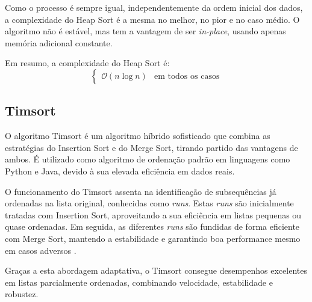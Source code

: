 \documentclass[conference]{IEEEtran}
\begin{document}
Como o processo é sempre igual, independentemente da ordem inicial dos dados, a complexidade do Heap Sort é a mesma no melhor, no pior e no caso médio. O algoritmo não é estável, mas tem a vantagem de ser \textit{in-place}, usando apenas memória adicional constante.

Em resumo, a complexidade do Heap Sort é:
\[
\begin{cases}
\mathcal{O}(n \log n) & \text{em todos os casos}
\end{cases}
\]

\subsection{Timsort}

O algoritmo Timsort é um algoritmo híbrido sofisticado que combina as estratégias do Insertion Sort e do Merge Sort, tirando partido das vantagens de ambos. É utilizado como algoritmo de ordenação padrão em linguagens como Python e Java, devido à sua elevada eficiência em dados reais.

O funcionamento do Timsort assenta na identificação de subsequências já ordenadas na lista original, conhecidas como \textit{runs}. Estas \textit{runs} são inicialmente tratadas com Insertion Sort, aproveitando a sua eficiência em listas pequenas ou quase ordenadas. Em seguida, as diferentes \textit{runs} são fundidas de forma eficiente com Merge Sort, mantendo a estabilidade e garantindo boa performance mesmo em casos adversos \cite{auger2019worstcasecomplexitytimsort}.

Graças a esta abordagem adaptativa, o Timsort consegue desempenhos excelentes em listas parcialmente ordenadas, combinando velocidade, estabilidade e robustez.
\end{document}
